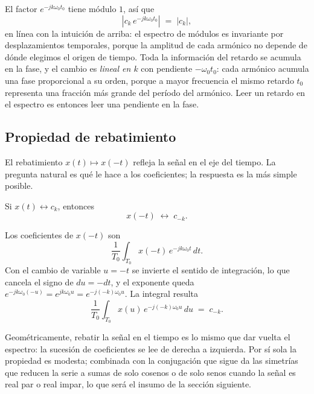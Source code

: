 \documentclass[class=book, crop=false]{standalone}
\begin{document}
El factor $e^{-jk\omega_0 t_0}$ tiene módulo $1$, así que
\begin{equation*}
    |c_k\,e^{-jk\omega_0 t_0}| \;=\; |c_k|,
\end{equation*}
en línea con la intuición de arriba: el espectro de módulos es
invariante por desplazamientos temporales, porque la amplitud de
cada armónico no depende de dónde elegimos el origen de tiempo.
Toda la información del retardo se acumula en la fase, y el cambio
es \emph{lineal en $k$} con pendiente $-\omega_0 t_0$: cada
armónico acumula una fase proporcional a su orden, porque a mayor
frecuencia el mismo retardo $t_0$ representa una fracción más
grande del período del armónico. Leer un retardo en el espectro es
entonces leer una pendiente en la fase.

\subsection{Propiedad de rebatimiento}
\label{subsec:prop_rebatimiento}

El rebatimiento $x(t)\mapsto x(-t)$ refleja la señal en el eje del
tiempo. La pregunta natural es qué le hace a los coeficientes; la
respuesta es la más simple posible.

\begin{resultado}[Rebatimiento]
Si $x(t)\leftrightarrow c_k$, entonces
\begin{equation}
    x(-t) \;\longleftrightarrow\; c_{-k}.
    \label{eq:prop_rebatimiento}
\end{equation}
\end{resultado}

Los coeficientes de $x(-t)$ son
\begin{equation*}
    \frac{1}{T_0}\int_{T_0} x(-t)\,e^{-jk\omega_0 t}\,dt.
\end{equation*}
Con el cambio de variable $u = -t$ se invierte el sentido de
integración, lo que cancela el signo de $du = -dt$, y el exponente
queda $e^{-jk\omega_0(-u)} = e^{j k\omega_0 u} = e^{-j(-k)\omega_0 u}$.
La integral resulta
\begin{equation*}
    \frac{1}{T_0}\int_{T_0} x(u)\,e^{-j(-k)\omega_0 u}\,du \;=\; c_{-k}.
\end{equation*}

Geométricamente, rebatir la señal en el tiempo es lo mismo que dar
vuelta el espectro: la sucesión de coeficientes se lee de derecha a
izquierda. Por sí sola la propiedad es modesta; combinada con la
conjugación que sigue da las simetrías que reducen la serie a
sumas de solo cosenos o de solo senos cuando la señal es real par o
real impar, lo que será el insumo de la sección siguiente.
\end{document}
